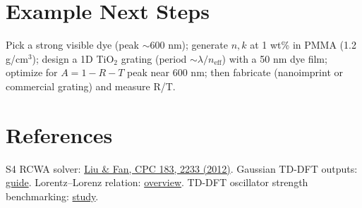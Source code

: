 \documentclass[11pt,a4paper]{article}
\begin{document}
\section{Example Next Steps}
Pick a strong visible dye (peak $\sim$600 nm); generate $n,k$ at 1 wt\% in PMMA (1.2 g/cm$^3$); design a 1D TiO$_2$ grating (period $\sim \lambda/n_{\mathrm{eff}}$) with a 50 nm dye film; optimize for $A=1-R-T$ peak near 600 nm; then fabricate (nanoimprint or commercial grating) and measure R/T.

\section*{References}
S4 RCWA solver: \href{https://web.stanford.edu/group/fan/publication/Liu_ComputerPhysicsCommunications_183_2233_2012.pdf}{Liu \& Fan, CPC 183, 2233 (2012)}. Gaussian TD-DFT outputs: \href{https://joaquinbarroso.com/2022/09/06/population-analysis-in-the-excited-state-with-gaussian/}{guide}. Lorentz--Lorenz relation: \href{https://www.theochem.ru.nl/~pwormer/Knowino/knowino.org/wiki/Lorentz-Lorenz_relation.html}{overview}. TD-DFT oscillator strength benchmarking: \href{https://pfloos.github.io/WEB_LOOS/pub/97.pdf}{study}.
\end{document}
